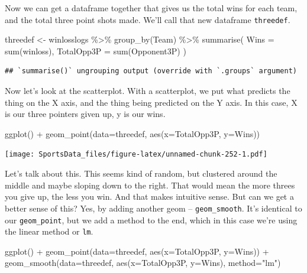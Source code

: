 \documentclass[
]{book}
\newenvironment{Shaded}{\begin{snugshade}}{\end{snugshade}}
\newcommand{\AttributeTok}[1]{\textcolor[rgb]{0.77,0.63,0.00}{#1}}
\newcommand{\FunctionTok}[1]{\textcolor[rgb]{0.00,0.00,0.00}{#1}}
\newcommand{\NormalTok}[1]{#1}
\newcommand{\OtherTok}[1]{\textcolor[rgb]{0.56,0.35,0.01}{#1}}
\newcommand{\SpecialCharTok}[1]{\textcolor[rgb]{0.00,0.00,0.00}{#1}}
\newcommand{\StringTok}[1]{\textcolor[rgb]{0.31,0.60,0.02}{#1}}
\begin{document}
Now we can get a dataframe together that gives us the total wins for each team, and the total three point shots made. We'll call that new dataframe \texttt{threedef}.

\begin{Shaded}
\begin{Highlighting}[]
\NormalTok{threedef }\OtherTok{\textless{}{-}}\NormalTok{ winlosslogs }\SpecialCharTok{\%\textgreater{}\%} 
  \FunctionTok{group\_by}\NormalTok{(Team) }\SpecialCharTok{\%\textgreater{}\%} 
  \FunctionTok{summarise}\NormalTok{(}
    \AttributeTok{Wins =} \FunctionTok{sum}\NormalTok{(winloss), }
    \AttributeTok{TotalOpp3P =} \FunctionTok{sum}\NormalTok{(Opponent3P)}
\NormalTok{    )}
\end{Highlighting}
\end{Shaded}

\begin{verbatim}
## `summarise()` ungrouping output (override with `.groups` argument)
\end{verbatim}

Now let's look at the scatterplot. With a scatterplot, we put what predicts the thing on the X axis, and the thing being predicted on the Y axis. In this case, X is our three pointers given up, y is our wins.

\begin{Shaded}
\begin{Highlighting}[]
\FunctionTok{ggplot}\NormalTok{() }\SpecialCharTok{+} \FunctionTok{geom\_point}\NormalTok{(}\AttributeTok{data=}\NormalTok{threedef, }\FunctionTok{aes}\NormalTok{(}\AttributeTok{x=}\NormalTok{TotalOpp3P, }\AttributeTok{y=}\NormalTok{Wins))}
\end{Highlighting}
\end{Shaded}

\texttt{[image: SportsData\_files/figure-latex/unnamed-chunk-252-1.pdf]}

Let's talk about this. This seems kind of random, but clustered around the middle and maybe sloping down to the right. That would mean the more threes you give up, the less you win. And that makes intuitive sense. But can we get a better sense of this? Yes, by adding another geom -- \texttt{geom\_smooth}. It's identical to our \texttt{geom\_point}, but we add a method to the end, which in this case we're using the linear method or \texttt{lm}.

\begin{Shaded}
\begin{Highlighting}[]
\FunctionTok{ggplot}\NormalTok{() }\SpecialCharTok{+} 
  \FunctionTok{geom\_point}\NormalTok{(}\AttributeTok{data=}\NormalTok{threedef, }\FunctionTok{aes}\NormalTok{(}\AttributeTok{x=}\NormalTok{TotalOpp3P, }\AttributeTok{y=}\NormalTok{Wins)) }\SpecialCharTok{+}
  \FunctionTok{geom\_smooth}\NormalTok{(}\AttributeTok{data=}\NormalTok{threedef, }\FunctionTok{aes}\NormalTok{(}\AttributeTok{x=}\NormalTok{TotalOpp3P, }\AttributeTok{y=}\NormalTok{Wins), }\AttributeTok{method=}\StringTok{"lm"}\NormalTok{)}
\end{Highlighting}
\end{Shaded}
\end{document}
